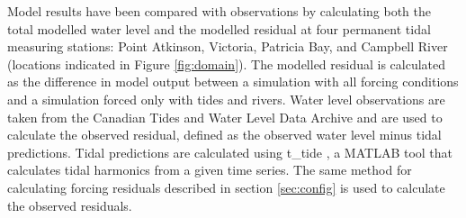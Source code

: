 \documentclass[letterpaper]{tATO2e}
\begin{document}
Model results have been compared with observations by calculating both the total modelled water level and the modelled residual at four permanent tidal measuring stations: Point Atkinson, Victoria, Patricia Bay, and Campbell River (locations indicated in Figure \ref{fig:domain}). The modelled residual is calculated as the difference in model output between a simulation with all forcing conditions and a simulation forced only with tides and rivers. Water level observations are taken from the Canadian Tides and Water Level Data Archive \citep{DFOObservations} and are used to calculate the observed residual, defined as the observed water level minus tidal predictions. Tidal predictions are calculated using t\_tide \citep{pawlowicz2002classical}, a MATLAB tool that calculates tidal harmonics from a given time series. {\color{red} The same method for calculating forcing residuals described in section \ref{sec:config} is used to calculate the observed residuals.} 
\end{document}
